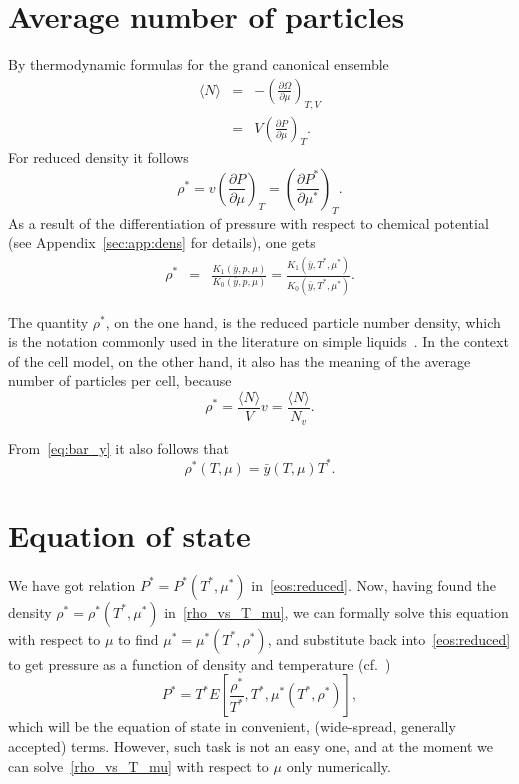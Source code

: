 \documentclass[12pt]{article}
\numberwithin{equation}{section}
\begin{document}
	
	\pagebreak
	\section{Average number of particles}
	By thermodynamic formulas for the grand canonical ensemble
	\begin{eqnarray}
		\langle N \rangle & = & -\left(\frac{\partial \Omega}{\partial \mu}\right)_{T,V}
		\nonumber\\
		& = & V \left(\frac{\partial P}{\partial \mu}\right)_T.
	\end{eqnarray}
	For reduced density it follows
	\begin{equation}
		\label{eq:dens}
		\rho^* = v\left(\frac{\partial P}{\partial \mu}\right)_T = \left(\frac{\partial P^*}{\partial \mu^*}\right)_T.
	\end{equation}
	As a result of the differentiation of pressure with respect to chemical potential (see Appendix~\ref{sec:app:dens} for details), one gets
	\begin{eqnarray}
		\label{eq:densK}
		\rho^* &=& \frac{K_1(\bar{y}, p,\mu)}{K_0(\bar{y},p,\mu)} = \frac{K_1(\bar{y},T^*,\mu^*)}{K_0(\bar{y},T^*,\mu^*)}.
	\end{eqnarray}
	
	The quantity $\rho^*$, on the one hand, is the reduced particle number density, which is the notation commonly used in the literature on simple liquids~\cite{HansenMcDonald13}. In the context of the cell model, on the other hand, it also has the meaning of the average number of particles per cell, because
	\begin{equation}
		\rho^* = \frac{\langle N \rangle}{V} v = \frac{\langle N \rangle}{N_v}.
	\end{equation}
	
	From~\eqref{eq:bar_y} it also follows that
	\begin{equation}
		\label{rho_vs_T_mu}
		\rho^*(T,\mu) = \bar{y}(T,\mu) T^*.
	\end{equation}
	
	\section{Equation of state}
	We have got relation $P^* = P^*(T^*, \mu^*)$ in~\eqref{eos:reduced}. Now, having found the density $\rho^* = \rho^*(T^*,\mu^*)$ in~\eqref{rho_vs_T_mu}, we can formally solve this equation with respect to $\mu$ to find $\mu^* = \mu^*(T^*,\rho^*)$, and substitute back into~\eqref{eos:reduced} to get pressure as a function of density and temperature (cf.~\cite[(2.28)]{KKD20})
	\begin{equation}
		P^* = T^* E\left[\frac{\rho^*}{T^*},T^*, \mu^*(T^*,\rho^*)\right],
	\end{equation}
	which will be the equation of state in convenient, (wide-spread, generally accepted) terms. However, such task is not an easy one, and at the moment we can solve~\eqref{rho_vs_T_mu} with respect to $\mu$ only numerically.
	
\end{document}
